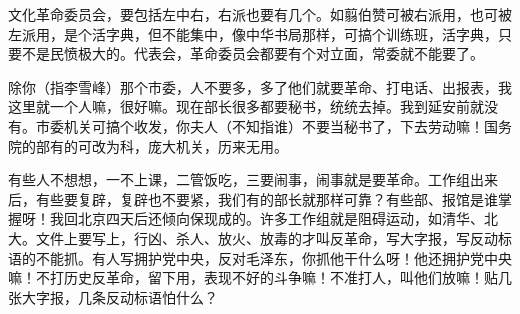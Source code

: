 文化革命委员会，要包括左中右，右派也要有几个。如翦伯赞可被右派用，也可被左派用，是个活字典，但不能集中，像中华书局那样，可搞个训练班，活字典，只要不是民愤极大的。代表会，革命委员会都要有个对立面，常委就不能要了。

除你（指李雪峰）那个市委，人不要多，多了他们就要革命、打电话、出报表，我这里就一个人嘛，很好嘛。现在部长很多都要秘书，统统去掉。我到延安前就没有。市委机关可搞个收发，你夫人（不知指谁）不要当秘书了，下去劳动嘛！国务院的部有的可改为科，庞大机关，历来无用。

有些人不想想，一不上课，二管饭吃，三要闹事，闹事就是要革命。工作组出来后，有些要复辟，复辟也不要紧，我们有的部长就那样可靠？有些部、报馆是谁掌握呀！我回北京四天后还倾向保现成的。许多工作组就是阻碍运动，如清华、北大。文件上要写上，行凶、杀人、放火、放毒的才叫反革命，写大字报，写反动标语的不能抓。有人写拥护党中央，反对毛泽东，你抓他干什么呀！他还拥护党中央嘛！不打历史反革命，留下用，表现不好的斗争嘛！不准打人，叫他们放嘛！贴几张大字报，几条反动标语怕什么？


